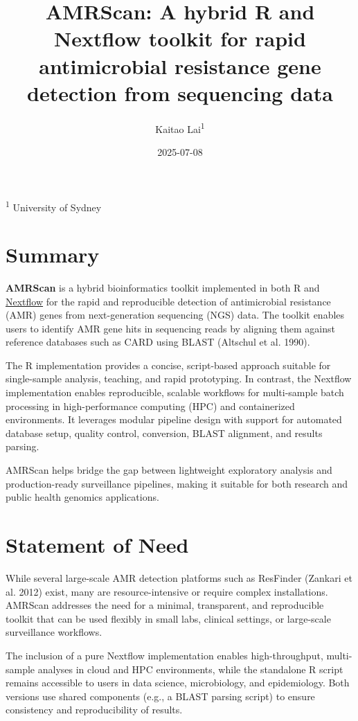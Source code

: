 \documentclass[
]{article}
\title{AMRScan: A hybrid R and Nextflow toolkit for rapid antimicrobial
resistance gene detection from sequencing data}
\author{Kaitao Lai\textsuperscript{1}}
\date{2025-07-08}
\begin{document}
\maketitle

\textsuperscript{1} University of Sydney

\section{Summary}\label{summary}

\textbf{AMRScan} is a hybrid bioinformatics toolkit implemented in both
R and \href{https://www.nextflow.io/}{Nextflow} for the rapid and
reproducible detection of antimicrobial resistance (AMR) genes from
next-generation sequencing (NGS) data. The toolkit enables users to
identify AMR gene hits in sequencing reads by aligning them against
reference databases such as CARD using BLAST (Altschul et al. 1990).

The R implementation provides a concise, script-based approach suitable
for single-sample analysis, teaching, and rapid prototyping. In
contrast, the Nextflow implementation enables reproducible, scalable
workflows for multi-sample batch processing in high-performance
computing (HPC) and containerized environments. It leverages modular
pipeline design with support for automated database setup, quality
control, conversion, BLAST alignment, and results parsing.

AMRScan helps bridge the gap between lightweight exploratory analysis
and production-ready surveillance pipelines, making it suitable for both
research and public health genomics applications.

\section{Statement of Need}\label{statement-of-need}

While several large-scale AMR detection platforms such as ResFinder
(Zankari et al. 2012) exist, many are resource-intensive or require
complex installations. AMRScan addresses the need for a minimal,
transparent, and reproducible toolkit that can be used flexibly in small
labs, clinical settings, or large-scale surveillance workflows.

The inclusion of a pure Nextflow implementation enables high-throughput,
multi-sample analyses in cloud and HPC environments, while the
standalone R script remains accessible to users in data science,
microbiology, and epidemiology. Both versions use shared components
(e.g., a BLAST parsing script) to ensure consistency and reproducibility
of results.
\end{document}
